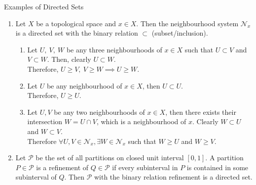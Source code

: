 \begin{remark}
	Examples of Directed Sets
	\begin{enumerate}
		\item Let \( X \) be a topological space and \( x \in X \). Then the neighbourhood system \( \mathcal{N}_x \) is a directed set with the binary relation \( \subset \) (subset/inclusion).
			\begin{enumerate}
				\item Let \( U,\ V,\ W \) be any three neighbourhoods of \( x \in X \) such that \( U \subset V \) and \( V \subset W \). Then, clearly \( U \subset W \).\\ Therefore, \( U \ge V,\ V \ge W \implies U \ge W \).
				\item Let \( U \) be any neighbourhood of \( x \in X \), then \( U \subset U \).\\ Therefore, \( U \ge U \).
				\item Let \( U,V \) be any two neighbourhoods of \( x \in X \), then there exists their intersection \( W = U\cap V \), which is a neighbourhood of \( x \). Clearly \( W \subset U \) and \( W \subset V \).\\ Therefore \( \forall U,V \in \mathcal{N}_x, \exists W \in \mathcal{N}_x \) such that \( W \ge U \) and \( W \ge V \).
			\end{enumerate}
		\item Let \( \mathcal{P} \) be the set of all partitions on closed unit interval \( [0,1] \). A partition \( P \in \mathcal{P} \) is a refinement of \( Q \in \mathcal{P} \) if every subinterval in \( P \) is contained in some subinterval of \( Q \). Then \( \mathcal{P} \) with the binary relation refinement is a directed set.\\


\end{enumerate}
\end{remark}

